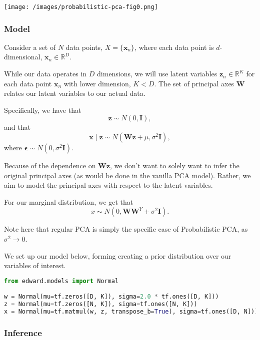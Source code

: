 \texttt{[image: /images/probabilistic-pca-fig0.png]}

\subsubsection{Model}

Consider a set of $N$ data points, $X = \{\mathbf{x}_n\}$, where each
data point is $d$-dimensional, $\mathbf{x}_n \in \mathbb{R}^D$.

While our data operates in $D$ dimensions, we will use latent variables
$\mathbf{z}_n \in \mathbb{R}^K$ for each data point $\mathbf{x}_n$
with lower dimension, $K < D$. The set of principal axes
$\mathbf{W}$ relates our latent variables to our actual data.

Specifically, we have that
\begin{equation*}
\mathbf{z} \sim N(0, \mathbf{I}),
\end{equation*}
and that
\begin{equation*}
\mathbf{x} \mid \mathbf{z} \sim N(\mathbf{Wz} + \mu, \sigma^2\mathbf{I}),
\end{equation*}
where $\mathbf{\epsilon} \sim N(0, \sigma^2\mathbf{I})$.

Because of the dependence on $\mathbf{Wz}$, we don't want to solely
want to infer the original principal axes (as would be done in the
vanilla PCA model). Rather, we aim to model the principal axes with
respect to the latent variables.

For our marginal distribution, we get that
\begin{equation*}
x \sim N(0, \mathbf{W}\mathbf{W}^Y + \sigma^2\mathbf{I}).
\end{equation*}

Note here that regular PCA is simply the specific case of
Probabilistic PCA, as $\sigma^2 \to 0$.

We set up our model below, forming creating a prior distribution over
our variables of interest.

\begin{lstlisting}[language=Python]
from edward.models import Normal

w = Normal(mu=tf.zeros([D, K]), sigma=2.0 * tf.ones([D, K]))
z = Normal(mu=tf.zeros([N, K]), sigma=tf.ones([N, K]))
x = Normal(mu=tf.matmul(w, z, transpose_b=True), sigma=tf.ones([D, N]))

\end{lstlisting}

\subsubsection{Inference}

